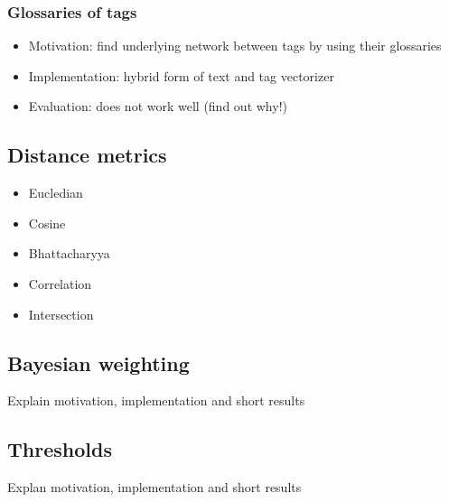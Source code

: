 \subsubsection{Glossaries of tags}
\begin{itemize}
\item Motivation: find underlying network between tags by using their glossaries
\item Implementation: hybrid form of text and tag vectorizer
\item Evaluation: does not work well (find out why!) 
\end{itemize}

\subsection{Distance metrics}
\begin{itemize}
\item Eucledian
\item Cosine
\item Bhattacharyya
\item Correlation
\item Intersection
\end{itemize}

\subsection{Bayesian weighting}
Explain motivation, implementation and short results

\subsection{Thresholds}
Explan motivation, implementation and short results